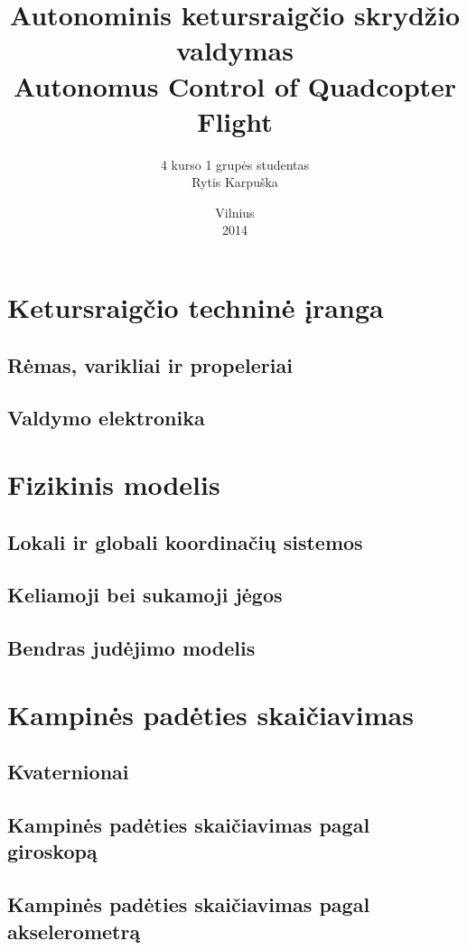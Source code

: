 \documentclass[12pt, a4paper, lithuanian, final]{article}
\title{Autonominis ketursraigčio skrydžio valdymas\\Autonomus Control of Quadcopter Flight}
\author{
    4 kurso 1 grupės studentas \\
    Rytis Karpuška
}
\date{Vilnius \\
	2014}
\begin{document}
\maketitle
\tableofcontents






\section{Ketursraigčio techninė įranga}
\subsection{Rėmas, varikliai ir propeleriai}
\subsection{Valdymo elektronika}



\section{Fizikinis modelis}
\subsection{Lokali ir globali koordinačių sistemos}
\subsection{Keliamoji bei sukamoji jėgos}
\subsection{Bendras judėjimo modelis}



\section{Kampinės padėties skaičiavimas}
\subsection{Kvaternionai}
\subsection{Kampinės padėties skaičiavimas pagal giroskopą}
\subsection{Kampinės padėties skaičiavimas pagal akselerometrą}
\end{document}
